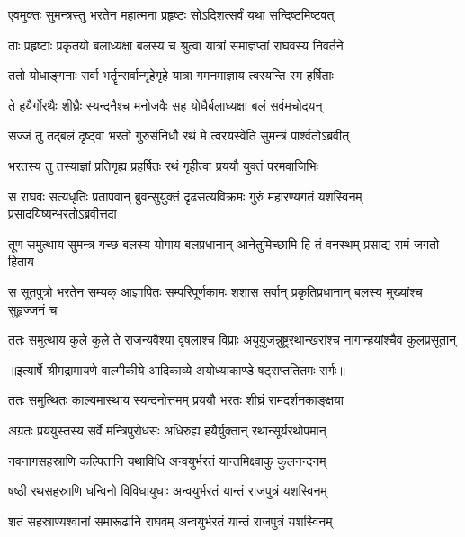 \twolineshloka
{एवमुक्तः सुमन्त्रस्तु भरतेन महात्मना}
{प्रहृष्टः सोऽदिशत्सर्वं यथा सन्दिष्टमिष्टवत्} %

\twolineshloka
{ताः प्रहृष्टाः प्रकृतयो बलाध्यक्षा बलस्य च}
{श्रुत्वा यात्रां समाज्ञप्तां राघवस्य निवर्तने} %

\twolineshloka
{ततो योधाङ्गनाः सर्वा भर्तॄन्सर्वान्गृहेगृहे}
{यात्रा गमनमाज्ञाय त्वरयन्ति स्म हर्षिताः} %

\twolineshloka
{ते हयैर्गोरथैः शीघ्रैः स्यन्दनैश्च मनोजवैः}
{सह योधैर्बलाध्यक्षा बलं सर्वमचोदयन्} %

\twolineshloka
{सज्जं तु तद्बलं दृष्ट्वा भरतो गुरुसंनिधौ}
{रथं मे त्वरयस्वेति सुमन्त्रं पार्श्वतोऽब्रवीत्} %

\twolineshloka
{भरतस्य तु तस्याज्ञां प्रतिगृह्य प्रहर्षितः}
{रथं गृहीत्वा प्रययौ युक्तं परमवाजिभिः} %

\fourlineindentedshloka
{स राघवः सत्यधृतिः प्रतापवान्}
{ब्रुवन्सुयुक्तं दृढसत्यविक्रमः}
{गुरुं महारण्यगतं यशस्विनम्}
{प्रसादयिष्यन्भरतोऽब्रवीत्तदा} %

\fourlineindentedshloka
{तूण समुत्थाय सुमन्त्र गच्छ}
{बलस्य योगाय बलप्रधानान्}
{आनेतुमिच्छामि हि तं वनस्थम्}
{प्रसाद्य रामं जगतो हिताय} %

\fourlineindentedshloka
{स सूतपुत्रो भरतेन सम्यक्}
{आज्ञापितः सम्परिपूर्णकामः}
{शशास सर्वान् प्रकृतिप्रधानान्}
{बलस्य मुख्यांश्च सुहृज्जनं च} %

\fourlineindentedshloka
{ततः समुत्थाय कुले कुले ते}
{राजन्यवैश्या वृषलाश्च विप्राः}
{अयूयुजन्नुष्ट्ररथान्खरांश्च}
{नागान्हयांश्चैव कुलप्रसूतान्} %


{॥इत्यार्षे श्रीमद्रामायणे वाल्मीकीये आदिकाव्ये अयोध्याकाण्डे षट्सप्ततितमः सर्गः॥}


\twolineshloka
{ततः समुत्थितः काल्यमास्थाय स्यन्दनोत्तमम्}
{प्रययौ भरतः शीघ्रं रामदर्शनकाङ्क्षया} %

\twolineshloka
{अग्रतः प्रययुस्तस्य सर्वे मन्त्रिपुरोधसः}
{अधिरुह्य हयैर्युक्तान् रथान्सूर्यरथोपमान्} %

\twolineshloka
{नवनागसहस्राणि कल्पितानि यथाविधि}
{अन्वयुर्भरतं यान्तमिक्ष्वाकु कुलनन्दनम्} %

\twolineshloka
{षष्ठी रथसहस्राणि धन्विनो विविधायुधाः}
{अन्वयुर्भरतं यान्तं राजपुत्रं यशस्विनम्} %

\twolineshloka
{शतं सहस्राण्यश्वानां समारूढानि राघवम्}
{अन्वयुर्भरतं यान्तं राजपुत्रं यशस्विनम्} %

